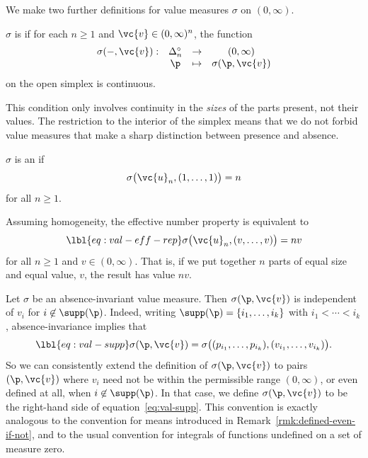 We make two further definitions for value measures $\sigma$ on $(0,
\infty)$.

\begin{defn}
$\sigma$ is  if for each $n \geq 1$ and $\vc{v} \in (0,
\infty)^n$, the function
\[
\begin{array}{cccc}
\sigma(-, \vc{v}):      &\Delta_n^\circ  &\to            &(0, \infty)    \\
                        &\p              &\mapsto        &\sigma(\p, \vc{v})
\end{array}
\]
on the open simplex is continuous.
\end{defn}

This condition only involves continuity in the \emph{sizes} of the parts
present, not their values.  The restriction to the interior of the simplex
means that we do not forbid value measures that make a sharp distinction
between presence and absence.

\begin{defn}
$\sigma$ is an  if 
\[
\sigma\bigl( \vc{u}_n, (1, \ldots, 1) \bigr) = n
\]
for all $n \geq 1$.
\end{defn}

Assuming homogeneity, the effective number property is equivalent to 
% 
\begin{equation}
\lbl{eq:val-eff-rep}
\sigma\bigl(\vc{u}_n, (v, \ldots, v)\bigr) = nv
\end{equation}
% 
for all $n \geq 1$ and $v \in (0, \infty)$.  That is, if we put together
$n$ parts of equal size and equal value, $v$, the result has value $nv$.  

\begin{remark}
Let $\sigma$ be an absence-invariant value measure.  Then $\sigma(\p,
\vc{v})$ is independent of $v_i$ for $i \not\in \supp(\p)$.  Indeed,
writing $\supp(\p) = \{i_1, \ldots, i_k\}$ with $i_1 < \cdots < i_k$,
absence-invariance implies that
% 
\begin{equation}
\lbl{eq:val-supp}
\sigma(\p, \vc{v})
=
\sigma\bigl( (p_{i_1}, \ldots, p_{i_k}), (v_{i_1}, \ldots, v_{i_k}) \bigr).
\end{equation}
% 
So we can consistently extend%
%
%
% 
the definition of $\sigma(\p, \vc{v})$ to pairs $(\p, \vc{v})$ where $v_i$
need not be within the permissible range $(0, \infty)$, or even defined at
all, when $i \not\in \supp(\p)$.  In that case, we define $\sigma(\p,
\vc{v})$ to be the right-hand side of equation~\eqref{eq:val-supp}.  This
convention is exactly analogous to the convention for means introduced in
Remark~\ref{rmk:defined-even-if-not}, and to the usual convention for
integrals of functions undefined on a set of measure zero.
\end{remark}

